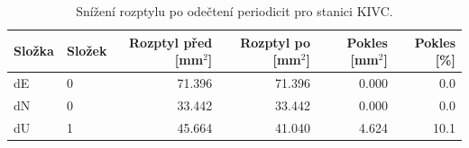 \begin{table}[H]
\centering
\small
\caption{Snížení rozptylu po odečtení periodicit pro stanici KIVC.}
\label{tab:gop25wd04_stcd_kivc_detr_weighted_1seg_spectral_lomb_scargle_variance_reduction}
\begin{tabular}{llrrrr}
\toprule
Složka & Složek & Rozptyl před [mm$^2$] & Rozptyl po [mm$^2$] & Pokles [mm$^2$] & Pokles [\%] \\
\midrule
dE & 0 & 71.396 & 71.396 & 0.000 & 0.0 \\
dN & 0 & 33.442 & 33.442 & 0.000 & 0.0 \\
dU & 1 & 45.664 & 41.040 & 4.624 & 10.1 \\
\bottomrule
\end{tabular}
\end{table}
